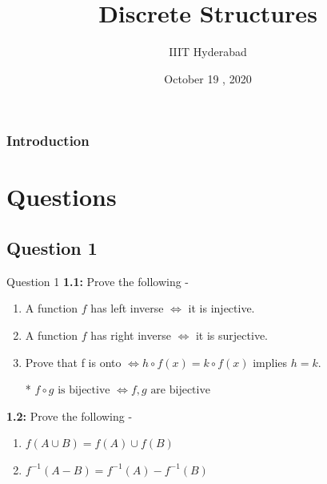 \documentclass[xcolor=svgnames]{beamer}
\title[Discrete Structures]{Discrete Structures} %
\author{IIIT Hyderabad} %
\institute[] %
{
Monsoon 2020 \\ %
\medskip
\textit{Tutorial 10} %
}
\date{October 19 , 2020} %
\begin{document}
\begin{frame}
\titlepage %
\end{frame}

\begin{frame}
\frametitle{Introduction} %
\tableofcontents %
\end{frame}


\section{Questions}

\subsection{Question 1}

\begin{frame}{Question 1}
\textbf{1.1:} Prove the following -
\begin{enumerate}
    \item A function $f$ has left inverse $\iff$ it is injective.
    \item A function $f$ has right inverse $\iff$ it is surjective.
    \item Prove that f is onto $\iff h \circ f(x) = k \circ f(x) $ implies $h=k$. 
    \item [*]$f \circ g \text{ is bijective } \iff f, g \text{ are bijective}$
\end{enumerate}
\textbf{1.2:} Prove the following - 
\begin{enumerate}
    \item $f(A \cup B) = f(A)\cup f(B)$
    \item $f^{-1}(A - B) = f^{-1}(A) - f^{-1}(B)$
\end{enumerate}    

\end{frame}
\end{document}

